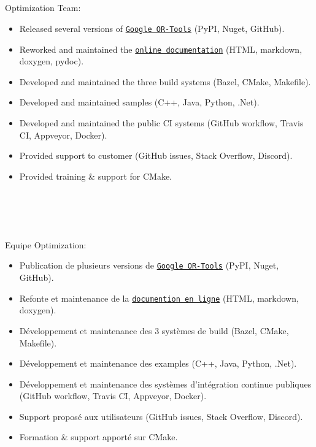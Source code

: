 \documentclass{resume}
\begin{document}
 {
   \\
   \\
   \\
   \\
  Optimization Team:\\
  \begin{itemize}
  	\item Released several versions of
      \href{https://github.com/google/or-tools}{\texttt{Google OR-Tools}} (PyPI, Nuget, GitHub).
  	\item Reworked and maintained the
      \href{https://developers.google.com/optimization/}{\texttt{online documentation}}
      (HTML, markdown, doxygen, pydoc).
  	\item Developed and maintained the three build systems (Bazel, CMake, Makefile).
  	\item Developed and maintained samples (C++, Java, Python, .Net).
  	\item Developed and maintained the public CI systems
      (GitHub workflow, Travis CI, Appveyor, Docker).
  	\item Provided support to customer (GitHub issues, Stack Overflow, Discord).
  	\item Provided training \& support for CMake.
  \end{itemize}
} {
   \\
   \\
   \\
   \\
  Equipe Optimization:\\
  \begin{itemize}
  	\item Publication de plusieurs versions de
  		\href{https://github.com/google/or-tools}{\texttt{Google OR-Tools}} (PyPI, Nuget, GitHub).
    \item Refonte et maintenance de la
      \href{https://developers.google.com/optimization/}{\texttt{documention en ligne}}
      (HTML, markdown, doxygen).
    \item D\'{e}veloppement et maintenance des 3 syst\`{e}mes de build (Bazel, CMake, Makefile).
    \item D\'{e}veloppement et maintenance des examples (C++, Java, Python, .Net).
    \item D\'{e}veloppement et maintenance des syst\`{e}mes d'int\'{e}gration continue publiques
      (GitHub workflow, Travis CI, Appveyor, Docker).
    \item Support propos\'{e} aux utilisateurs (GitHub issues, Stack Overflow, Discord).
    \item Formation \& support apport\'{e} sur CMake.
  \end{itemize}
}
\end{document}
